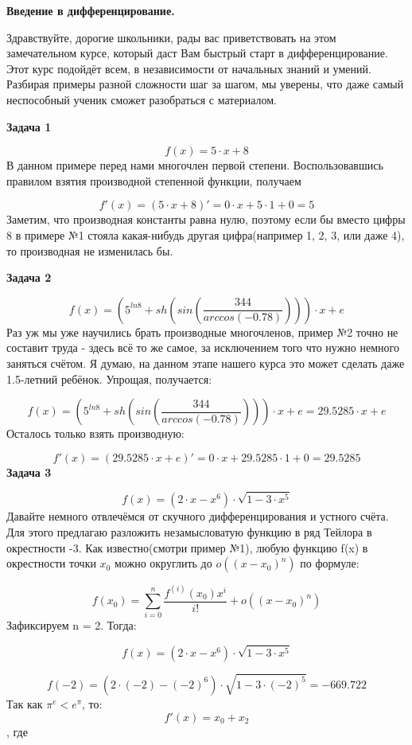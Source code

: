 \documentclass[12pt,a4paper,fleqn]{article}
\begin{document}
\begin{center}
{\bf \Large
Введение в дифференцирование.
}
\end{center}
Здравствуйте, дорогие школьники, рады вас приветствовать на этом замечательном курсе, который даст Вам быстрый старт в дифференцирование. Этот курс подойдёт всем, в независимости от начальных знаний и умений. Разбирая примеры разной сложности шаг за шагом, мы уверены, что даже самый неспособный ученик сможет разобраться с материалом.


\newpage
{\bf \Large
Задача 1
}

$$
f(x)=5\cdot x+8
$$
В данном примере перед нами многочлен первой степени. Воспользовавшись правилом взятия производной степенной функции, получаем

$$
f'(x)=(5\cdot x+8)'=0\cdot x+5\cdot1+0=5
$$
Заметим, что производная константы равна нулю, поэтому если бы вместо цифры 8 в примере №1 стояла какая-нибудь другая цифра(например 1, 2, 3, или даже 4), то производная не изменилась бы.

{\bf \Large
Задача 2
}

$$
f(x)=\left(5^{ ln8}+ sh\left( sin\left(\frac{344}{ arccos\left(-0.78\right)}\right)\right)\right)\cdot x+e
$$
Раз уж мы уже научились брать производные многочленов, пример №2 точно не составит труда - здесь всё то же самое, за исключением того что нужно немного заняться счётом. Я думаю, на данном этапе нашего курса это может сделать даже 1.5-летний ребёнок. Упрощая, получается:

$$
f(x)=\left(5^{ ln8}+ sh\left( sin\left(\frac{344}{ arccos\left(-0.78\right)}\right)\right)\right)\cdot x+e=29.5285\cdot x+e
$$
Осталось только взять производную:

$$
f'(x)=(29.5285\cdot x+e)'=0\cdot x+29.5285\cdot1+0=29.5285
$$
{\bf \Large
Задача 3
}

$$
f(x)=\left(2\cdot x- x^{6}\right)\cdot\sqrt{1-3\cdot x^{5}}
$$
Давайте немного отвлечёмся от скучного дифференцирования и устного счёта. Для этого предлагаю разложить незамысловатую функцию в ряд Тейлора в окрестности -3.
Как известно(смотри пример №1), любую функцию f(x) в окрестности точки $x_{0}$ можно округлить до $o((x-x_{0})^{n})$ по формуле:

$$
f(x_{0})=\sum_{i=0}^{n}\frac{f^{(i)}(x_{0})x^i}{i!} + o((x-x_{0})^{n})
$$
Зафиксируем n = 2. Тогда:

$$
f(x)=\left(2\cdot x- x^{6}\right)\cdot\sqrt{1-3\cdot x^{5}}
$$

$$
f(-2)=\left(2\cdot(-2)-(-2)^{6}\right)\cdot\sqrt{1-3\cdot(-2)^{5}}=-669.722
$$
Так как $\pi^{e}<e^{\pi}$, то:
$$
f'(x)= x_{0}+ x_{2}
$$
, где
\end{document}
